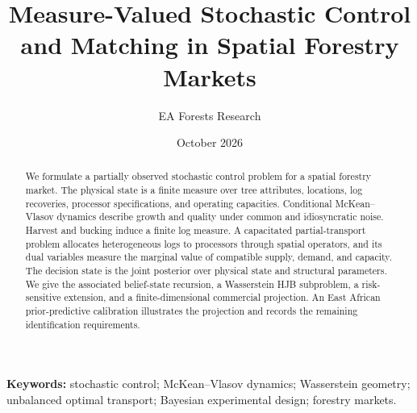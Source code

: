 \documentclass[11pt]{article}
\title{Measure-Valued Stochastic Control and Matching in Spatial Forestry Markets}
\author{EA Forests Research}
\date{October 2026}
\begin{document}
\maketitle

\begin{abstract}
We formulate a partially observed stochastic control problem for a spatial
forestry market. The physical state is a finite measure over tree attributes,
locations, log recoveries, processor specifications, and operating capacities.
Conditional McKean--Vlasov dynamics describe growth and quality under common and
idiosyncratic noise. Harvest and bucking induce a finite log measure. A
capacitated partial-transport problem allocates heterogeneous logs to processors
through spatial operators, and its dual variables measure the marginal value of
compatible supply, demand, and capacity. The decision state is the joint
posterior over physical state and structural parameters. We give the associated
belief-state recursion, a Wasserstein HJB subproblem, a risk-sensitive extension,
and a finite-dimensional commercial projection. An East African
prior-predictive calibration illustrates the projection and records the remaining
identification requirements.
\end{abstract}

\noindent\textbf{Keywords:} stochastic control; McKean--Vlasov dynamics;
Wasserstein geometry; unbalanced optimal transport; Bayesian experimental
design; forestry markets.

\tableofcontents
\clearpage













\end{document}
